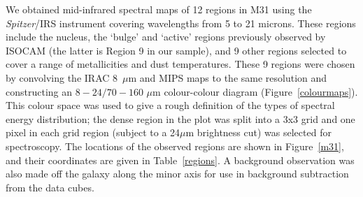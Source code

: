 \documentclass[useAMS,usenatbib,a4paper]{mn2e}
\begin{document}
We obtained mid-infrared spectral maps of 12 regions in M31 using the {\em Spitzer}/IRS instrument \citep{IRS2004} covering wavelengths from 5 to 21 microns. 
These regions include the nucleus, the `bulge' and `active' regions previously observed by ISOCAM (the latter is Region 9 in our sample), 
and 9 other regions selected to cover a range of metallicities and dust temperatures. These 9 regions were chosen by convolving the IRAC 8~$\mu$m \citep{Barmby2006lr}
and MIPS \citep{gordon06a} maps to the same resolution and constructing an $8 - 24/70 - 160$ $\mu$m colour-colour diagram (Figure~\ref{colourmaps}).
This colour space was used to give a rough definition of the types of spectral energy distribution; the 
dense region in the plot was split into a 3x3 grid and one pixel in each grid region (subject to a 24$\mu$m brightness cut)
was selected for spectroscopy. The locations of the observed regions are shown in Figure~\ref{m31}, and 
their coordinates are given in Table~\ref{regions}. A background observation was also made off the galaxy 
along the minor axis for use in background subtraction from the data cubes.
\end{document}
